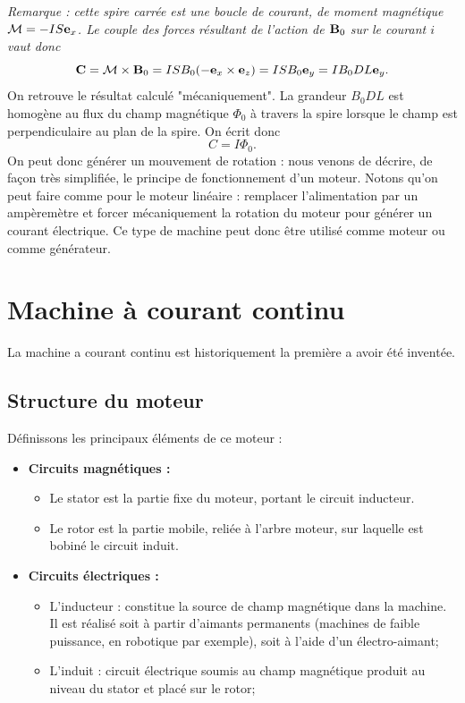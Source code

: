 \documentclass[11pt,a4paper]{report}
\begin{document}
\textit{Remarque : cette spire carrée est une boucle de courant, de moment magnétique $\mathcal{M} = -IS \bold{e}_x$. Le couple des forces résultant de l'action de $\bold{B}_0$ sur le courant $i$ vaut donc}
\begin{equation}
	\bold{C} = \mathcal{M}\times\bold{B}_0 = ISB_0 (-\bold{e}_x \times \bold{e}_z) = ISB_0 \bold{e}_y
	= IB_0 DL \bold{e}_y.
\end{equation}
On retrouve le résultat calculé "mécaniquement". La grandeur $B_0 DL$ est homogène au flux du champ magnétique $\Phi_0$ à travers la spire lorsque le champ est perpendiculaire au plan de la spire. On écrit donc
\begin{equation}
	\boxed{C = I \Phi_0}.
\end{equation}
On peut donc générer un mouvement de rotation : nous venons de décrire, de façon très simplifiée, le principe de fonctionnement d'un moteur. Notons qu'on peut faire comme pour le moteur linéaire : remplacer l'alimentation par un ampèremètre et forcer mécaniquement la rotation du moteur pour générer un courant électrique. Ce type de machine peut donc être utilisé comme moteur ou comme générateur.

\newpage
\section{Machine à courant continu}\label{sec:2}

La machine a courant continu est historiquement la première a avoir été inventée.

\subsection{Structure du moteur}

Définissons les principaux éléments de ce moteur : \\
\begin{itemize}
	\item \textbf{Circuits magnétiques :}
	\begin{itemize}
		\item Le stator est la partie fixe du moteur, portant le circuit inducteur.
		\item Le rotor est la partie mobile, reliée à l'arbre moteur, sur laquelle est bobiné le 				circuit induit.
	\end{itemize}
	\item \textbf{Circuits électriques :}
	\begin{itemize}
		\item L'inducteur : constitue la source de champ magnétique dans la machine. Il est réalisé 			soit à partir d'aimants permanents (machines de faible puissance, en robotique par exemple), 			soit à l'aide d'un électro-aimant;
		\item L'induit : circuit électrique soumis au champ magnétique produit au niveau du stator et 			placé sur le rotor;
	\end{itemize}
\end{itemize}
\end{document}
